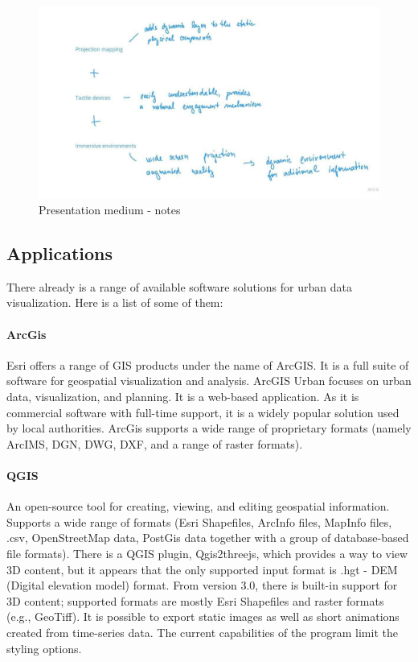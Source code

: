 \begin{figure}[h]
    \centering
    \includegraphics[width=\linewidth]{img/medium.jpg}
    \caption{Presentation medium - notes}
\end{figure}

\subsection{Applications}

There already is a range of available software solutions for urban data visualization. Here is a list of some of them:

\paragraph{ArcGis} 
Esri offers a range of GIS products under the name of ArcGIS. It is a full suite of software for geospatial visualization and analysis. ArcGIS Urban focuses on urban data, visualization, and planning. It is a web-based application. As it is commercial software with full-time support, it is a widely popular solution used by local authorities. ArcGis supports a wide range of proprietary formats (namely ArcIMS, DGN, DWG, DXF, and a range of raster formats). 

\paragraph{QGIS} An open-source tool for creating, viewing, and editing geospatial information. Supports a wide range of formats (Esri Shapefiles, ArcInfo files, MapInfo files, .csv, OpenStreetMap data, PostGis data together with a group of database-based file formats). There is a QGIS plugin, Qgis2threejs, which provides a way to view 3D content, but it appears that the only supported input format is .hgt - DEM (Digital elevation model) format. From version 3.0, there is built-in support for 3D content; supported formats are mostly Esri Shapefiles and raster formats (e.g., GeoTiff). It is possible to export static images as well as short animations created from time-series data. The current capabilities of the program limit the styling options. 

